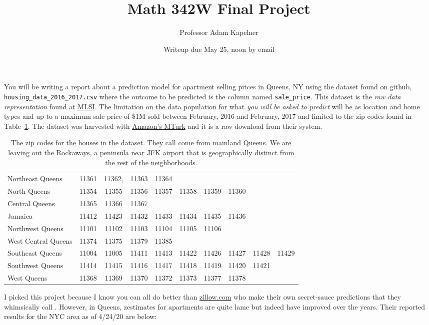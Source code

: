 \documentclass[12pt]{article}
\title{Math 342W Final Project \the\year}
\author{Professor Adam Kapelner}
\date{Writeup due May 25, noon by email}
\begin{document}
\maketitle

You will be writing a report about a prediction model for apartment selling prices in Queens, NY using the dataset found on github, \texttt{housing\_data\_2016\_2017.csv} where the outcome to be predicted is the column named \texttt{sale\_price}. This dataset is the \emph{raw data representation} found at \href{http://www.mlsli.com/}{MLSI}. The limitation on the data population for what \emph{you will be asked to predict} will be  as location and home types  and  up to a maximum sale price of \$1M sold between February, 2016 and February, 2017 and limited to the zip codes found in Table~\ref{tab:zipcodes}. The dataset was harvested with \href{mturk.com}{Amazon's MTurk} and it is a raw download from their system.


\begin{table}[htp]
\centering\footnotesize
\begin{tabular}{l|ccccccccc}
\hline
Northeast Queens		&11361& 11362,& 11363& 11364 \\
North Queens		&11354& 11355& 11356& 11357& 11358& 11359& 11360 \\
Central Queens		&11365& 11366& 11367 \\
Jamaica				&11412& 11423& 11432& 11433& 11434& 11435& 11436 \\
Northwest Queens	&11101& 11102& 11103& 11104& 11105& 11106 \\
West Central Queens	&11374& 11375& 11379& 11385 \\
Southeast Queens		&11004& 11005& 11411& 11413& 11422& 11426& 11427& 11428& 11429 \\
Southwest Queens	&11414& 11415& 11416& 11417& 11418& 11419& 11420& 11421 \\
West Queens			&11368& 11369& 11370& 11372& 11373& 11377& 11378 \\\hline
\end{tabular}
\caption{The zip codes for the houses in the dataset. They call come from mainland Queens. We are leaving out the Rockaways, a peninsula near JFK airport that is geographically distinct from the rest of the neighborhoods.}
\label{tab:zipcodes}
\end{table}

I picked this project because I know you can all do better than \url{zillow.com} who make their own secret-sauce predictions that they whimsically call . However, in Queens, zestimates for apartments are quite lame but indeed have improved over the years. Their reported results for the NYC area as of 4/24/20 are below:
\end{document}

